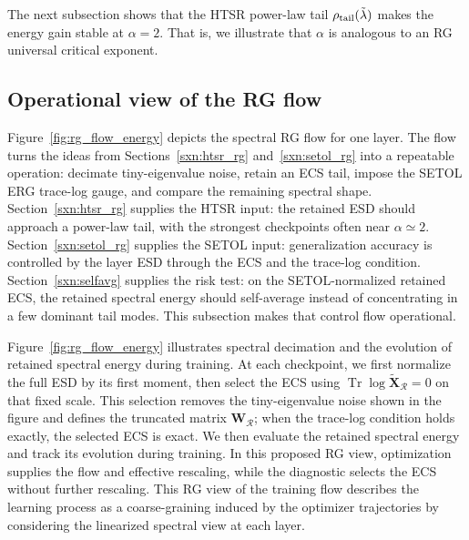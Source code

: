 \documentclass[10pt,twocolumn]{article}
\newcommand{\Tr}{\operatorname{Tr}}
\newcommand{\W}{\mathbf W}
\newcommand{\Xtilde}{\widetilde{\mathbf X}}
\newcommand{\Rell}{\mathcal R}
\begin{document}
The next subsection shows that the HTSR power-law tail $\rho_{\rm tail}(\tilde{\lambda})$ makes the energy gain stable at $\alpha=2$.
That is, we illustrate that $\alpha$ is analogous to an RG universal critical exponent.

\clearpage

\subsection{Operational view of the RG flow}
\label{sxn:effdescr}

Figure~\ref{fig:rg_flow_energy} depicts the spectral RG flow for one layer.  The flow turns the ideas from Sections~\ref{sxn:htsr_rg} and~\ref{sxn:setol_rg} into a repeatable operation: decimate tiny-eigenvalue noise, retain an ECS tail, impose the SETOL ERG trace-log gauge, and compare the remaining spectral shape.  Section~\ref{sxn:htsr_rg} supplies the HTSR input: the retained ESD should approach a power-law tail, with the strongest checkpoints often near $\alpha\simeq 2$.  Section~\ref{sxn:setol_rg} supplies the SETOL input: generalization accuracy is controlled by the layer ESD through the ECS and the trace-log condition.  Section~\ref{sxn:selfavg} supplies the risk test: on the SETOL-normalized retained ECS, the retained spectral energy should self-average instead of concentrating in a few dominant tail modes.  This subsection makes that control flow operational.


Figure~\ref{fig:rg_flow_energy} illustrates spectral decimation and the evolution of retained spectral energy during training. At each checkpoint, we first normalize the full ESD by its first moment, then select the ECS using $\Tr{\log \Xtilde_{\Rell}}=0$ on that fixed scale. This selection removes the tiny-eigenvalue noise shown in the figure and defines the truncated matrix $\W_{\Rell}$; when the trace-log condition holds exactly, the selected ECS is exact. We then evaluate the retained spectral energy and track its evolution during training. In this proposed RG view, optimization supplies the flow and effective rescaling, while the diagnostic selects the ECS without further rescaling.
This RG view of the training flow  describes the learning process as a coarse-graining induced by the  optimizer trajectories
by considering the linearized spectral view at each layer.
\end{document}
